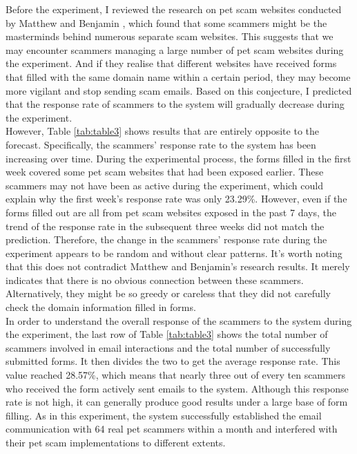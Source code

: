 \documentclass[ oneside,%
                    author={Cassie Qing Tang},
                    degree={BSc},
                     title={An Automated Response System for Disrupting Online Pet Scamming \\ },
                    subtitle={ }]{dissertation}
\begin{document}
Before the experiment, I reviewed the research on pet scam websites conducted by Matthew and Benjamin \cite{price_resource_2020}, which found that some scammers might be the masterminds behind numerous separate scam websites. This suggests that we may encounter scammers managing a large number of pet scam websites during the experiment. And if they realise that different websites have received forms that filled with the same domain name within a certain period, they may become more vigilant and stop sending scam emails. Based on this conjecture, I predicted that the response rate of scammers to the system will gradually decrease during the experiment.
\\

However, Table \ref{tab:table3} shows results that are entirely opposite to the forecast. Specifically, the scammers' response rate to the system has been increasing over time. During the experimental process, the forms filled in the first week covered some pet scam websites that had been exposed earlier. These scammers may not have been as active during the experiment, which could explain why the first week's response rate was only 23.29\%. However, even if the forms filled out are all from pet scam websites exposed in the past 7 days, the trend of the response rate in the subsequent three weeks did not match the prediction. Therefore, the change in the scammers' response rate during the experiment appears to be random and without clear patterns. It's worth noting that this does not contradict Matthew and Benjamin's research results. It merely indicates that there is no obvious connection between these scammers. Alternatively, they might be so greedy or careless that they did not carefully check the domain information filled in forms.
\\

In order to understand the overall response of the scammers to the system during the experiment, the last row of Table \ref{tab:table3} shows the total number of scammers involved in email interactions and the total number of successfully submitted forms. It then divides the two to get the average response rate. This value reached 28.57\%, which means that nearly three out of every ten scammers who received the form actively sent emails to the system. Although this response rate is not high, it can generally produce good results under a large base of form filling. As in this experiment, the system successfully established the email communication with 64 real pet scammers within a month and interfered with their pet scam implementations to different extents.
\end{document}
